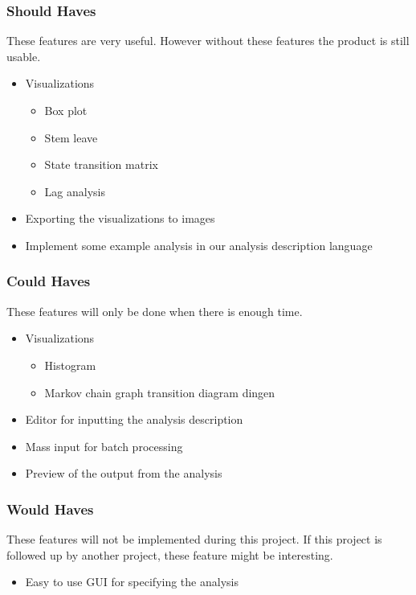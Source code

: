\subsubsection{Should Haves}
These features are very useful. However without these features the product is still usable.
\begin{itemize}
	\item Visualizations
    \begin{itemize}
    	\item Box plot
        \item Stem leave
        \item State transition matrix
        \item Lag analysis
    \end{itemize}
	\item Exporting the visualizations to images
    \item Implement some example analysis in our analysis description language
\end{itemize}

\subsubsection{Could Haves}
These features will only be done when there is enough time.
 \begin{itemize}
  \item Visualizations
  \begin{itemize}
	  \item Histogram
      \item Markov chain graph transition diagram dingen
  \end{itemize}
  \item Editor for inputting the analysis description 
  \item Mass input for batch processing 
  \item Preview of the output from the analysis
\end{itemize}

\subsubsection{Would Haves}
These features will not be implemented during this project. If this project is followed up by another project, these feature might be interesting.
\begin{itemize}
	\item Easy to use GUI for specifying the analysis 
\end{itemize}
